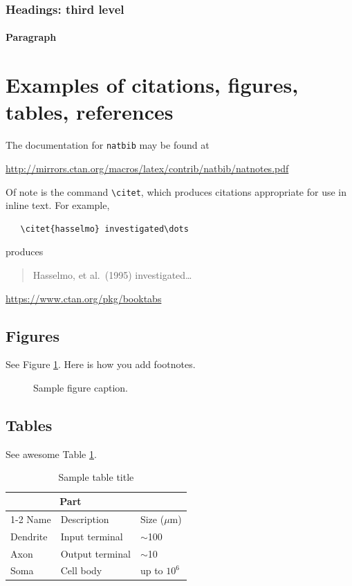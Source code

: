 \documentclass[twocolumn, switch]{article}
\begin{document}
\subsubsection{Headings: third level}
\lipsum[6]

\paragraph{Paragraph}
\lipsum[7]

\section{Examples of citations, figures, tables, references}
\label{sec:others}
\lipsum[8]

The documentation for \verb+natbib+ may be found at
\begin{center}
  \url{http://mirrors.ctan.org/macros/latex/contrib/natbib/natnotes.pdf}
\end{center}
Of note is the command \verb+\citet+, which produces citations appropriate for use in inline text. For example,
\begin{verbatim}
   \citet{hasselmo} investigated\dots
\end{verbatim}
produces
\begin{quote}
  Hasselmo, et al.\ (1995) investigated\dots
\end{quote}

\begin{center}
  \url{https://www.ctan.org/pkg/booktabs}
\end{center}


\subsection{Figures}
\lipsum[10]
See Figure \ref{fig:fig1}. Here is how you add footnotes. %
\lipsum[11]

\begin{figure}[H]
  \centering
  \fbox{\rule[-.5cm]{4cm}{4cm} \rule[-.5cm]{4cm}{0cm}}
  \caption{Sample figure caption.}
  \label{fig:fig1}
\end{figure}

\subsection{Tables}
\lipsum[12]
See awesome Table \ref{tab:table}.

\begin{table}[H]
 \caption{Sample table title}
  \centering
  \begin{tabular}{lll}
    \toprule
    \multicolumn{2}{c}{Part}                   \\
    \cmidrule(r){1-2}
    Name     & Description     & Size ($\mu$m) \\
    \midrule
    Dendrite & Input terminal  & $\sim$100     \\
    Axon     & Output terminal & $\sim$10      \\
    Soma     & Cell body       & up to $10^6$  \\
    \bottomrule
  \end{tabular}
  \label{tab:table}
\end{table}
\end{document}
